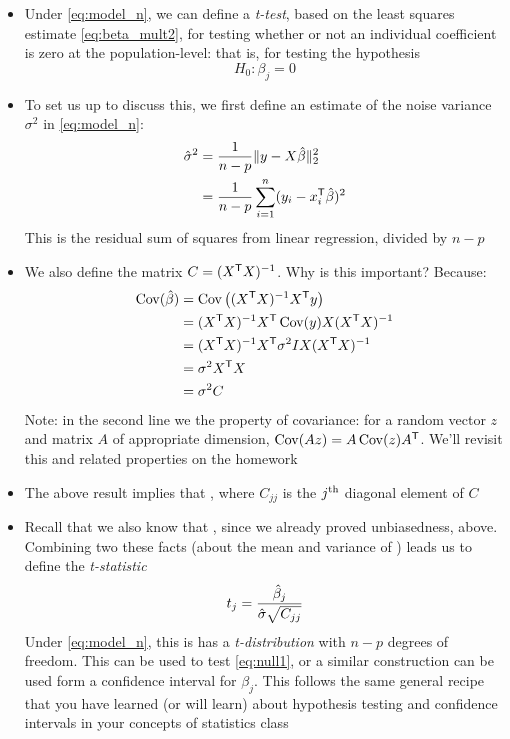 \documentclass{article}
\begin{document}
\begin{itemize}
\item Under \eqref{eq:model_n}, we can define a \emph{t-test}, based on the
  least squares estimate \eqref{eq:beta_mult2}, for testing whether or not an 
  individual coefficient is zero at the population-level: that is, for testing
  the hypothesis 
  \begin{equation}
  \label{eq:null1}
  H_0 : \beta_j = 0
  \end{equation}

\item To set us up to discuss this, we first define an estimate of the noise
  variance $\sigma^2$ in \eqref{eq:model_n}:
  \begin{align*}
  \hat\sigma^2 &= \frac{1}{n-p} \|y - X\hat{\beta}\|_2^2 \\ 
  &= \frac{1}{n-p} \sum_{i=1}^n (y_ i - x_i^{\mathsf{T}} \hat{\beta})^2 
  \end{align*}
  This is the residual sum of squares from linear regression, divided by $n-p$ 

\item We also define the matrix $C = (X^{\mathsf{T}} X)^{-1}$. Why is this important?
  Because: 
  \begin{align*}
  \operatorname{Cov}(\hat{\beta}) &= \operatorname{Cov}\big( (X^{\mathsf{T}} X)^{-1} X^{\mathsf{T}} y \big) \\
  &= (X^{\mathsf{T}} X)^{-1} X^{\mathsf{T}} \operatorname{Cov}(y) X (X^{\mathsf{T}} X)^{-1} \\
  &=  (X^{\mathsf{T}} X)^{-1} X^{\mathsf{T}} \sigma^2 I X (X^{\mathsf{T}} X)^{-1} \\
  &= \sigma^2 X^{\mathsf{T}} X \\
  &= \sigma^2 C
  \end{align*}
  Note: in the second line we the property of covariance: for a random vector
  $z$ and matrix $A$ of appropriate dimension, $\operatorname{Cov}(Az) = A \operatorname{Cov}(z)
  A^{\mathsf{T}}$. We'll revisit this and related properties on the homework

\item The above result implies that ,
  where $C_{jj}$ is the $j^{\textnormal{th}}$ diagonal element of $C$

\item Recall that we also know that , since we
  already proved unbiasedness, above. Combining two these facts (about the mean 
  and variance of ) leads us to define the \emph{t-statistic}  
  \begin{equation}
  \label{eq:t_stat}
  t_j = \frac{\hat{\beta}_j}{\hat\sigma \sqrt{C_{jj}}} 
  \end{equation}
  Under \eqref{eq:model_n}, this is has a \emph{t-distribution} with $n-p$
  degrees of freedom. This can be used to test \eqref{eq:null1}, or a similar
  construction can be used form a confidence interval for $\beta_j$. This
  follows the same general recipe that you have learned (or will learn) about
  hypothesis testing and confidence intervals in your concepts of statistics
  class 


\end{itemize}
\end{document}
